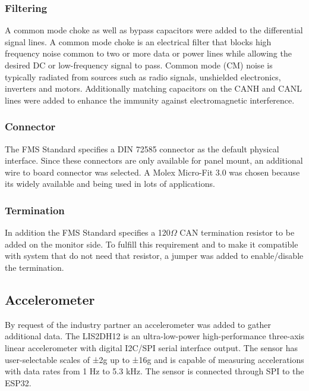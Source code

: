 \subsubsection{Filtering}
A common mode choke as well as bypass capacitors were added to the differential signal lines. A common mode choke is an electrical filter that blocks high frequency noise common to two or more data or power lines while allowing the desired DC or low-frequency signal to pass. Common mode (CM) noise is typically radiated from sources such as radio signals, unshielded electronics, inverters and motors. Additionally matching capacitors on the CANH and CANL lines were added to enhance the immunity against electromagnetic interference. 

\subsubsection{Connector}
The FMS Standard specifies a DIN 72585 connector as the default physical interface. Since these connectors are only available for panel mount, an additional wire to board connector was selected. A Molex Micro-Fit 3.0 was chosen because its widely available and being used in lots of applications.

\subsubsection{Termination}
In addition the FMS Standard specifies a 120$\Omega$ CAN termination resistor to be added on the monitor side. To fulfill this requirement and to make it compatible with system that do not need that resistor, a jumper was added to enable/disable the termination.   

\subsection{Accelerometer}
By request of the industry partner an accelerometer was added to gather additional data. The LIS2DH12 is an ultra-low-power high-performance three-axis linear accelerometer with digital I2C/SPI serial interface output. The sensor has user-selectable scales of ±2g up to ±16g and is capable of measuring accelerations with data rates from 1 Hz to 5.3 kHz. The sensor is connected through SPI to the ESP32.

\newpage
